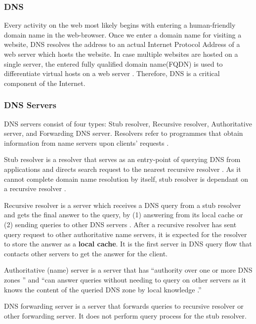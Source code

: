 \subsubsection{DNS}
Every activity on the web most likely begins with entering a human-friendly domain name in the web-browser. Once we enter a domain name for visiting a website, DNS resolves the address to an actual Internet Protocol Address of a web server which hosts the website. In case multiple websites are hosted on a single server, the entered fully qualified domain name(FQDN) is used to differentiate virtual hosts on a web server \cite{virtual24host}. Therefore, DNS is a critical component of the Internet.
\subsubsection{DNS Servers}\label{dnsservers}
DNS servers consist of four types: Stub resolver, Recursive resolver, Authoritative server, and Forwarding DNS server. Resolvers refer to programmes that obtain information from name servers upon clients' requests \cite{rfc1034}.

Stub resolver is a resolver that serves as an entry-point of querying DNS from applications and directs search request to the nearest recursive resolver \cite{rfc1123}. As it cannot complete domain name resolution by itself, stub resolver is dependant on a recursive resolver \cite{rfc8499}.

Recursive resolver is a server which receives a DNS query from a stub resolver and gets the final answer to the query, by (1) answering from its local cache or (2) sending queries to other DNS servers \cite{rfc8499}. After a recursive resolver has sent query request to other authoritative name servers, it is expected for the resolver to store the answer as a \textbf{local cache}. It is the first server in DNS query flow that contacts other servers to get the answer for the client. 

Authoritative (name) server is a server that has ``authority over one or more DNS zones \cite{rfc8499}'' and ``can answer queries without needing to query on other servers as it knows the content of the queried DNS zone by local knowledge \cite{rfc2182}.''

DNS forwarding server is a server that forwards queries to recursive resolver or other forwarding server. It does not perform query process for the stub resolver.
